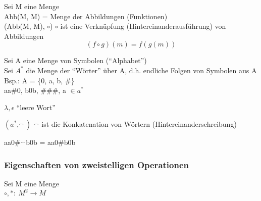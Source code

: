 \documentclass[bibtotoc,11pt,a4paper,]{scrartcl}
\begin{document}
      Sei M eine Menge\\
      Abb(M, M) = Menge der Abbildungen (Funktionen)\\
      (Abb(M, M), $\circ$) $\circ$ ist eine Verknüpfung (Hintereinanderausführung) von Abbildungen\\
      \begin{equation}
          (f \circ g)(m) = f(g(m))
      \end{equation}
      
      Sei A eine Menge von Symbolen (``Alphabet'')\\
      Sei $A^*$ die Menge der ``Wörter'' über A, d.h. endliche Folgen von Symbolen aus A\\
      
      Bsp.: A = \{0, a, b, \#\}\\
      aa\#0, b0b, \#\#\#, a $\in a^*$
      
      $\lambda, \epsilon$ ``leere Wort''
      
      $(a^*, ^{\smallfrown})$ $^{\smallfrown}$ ist die Konkatenation von Wörtern (Hintereinanderschreibung)
      
      aa0\#$^{\smallfrown}$b0b = aa0\#b0b
      
      \subsubsection{Eigenschaften von zweistelligen Operationen}
        
        Sei M eine Menge\\
        $\circ, \ast:\ M^2 \rightarrow M$
        
\end{document}
